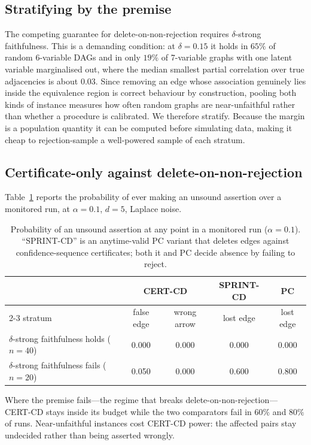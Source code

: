 \documentclass[11pt,a4paper]{article}
\theoremstyle{definition}
\theoremstyle{remark}
\begin{document}
\subsection{Stratifying by the premise}

The competing guarantee for delete-on-non-rejection requires
$\delta$-strong faithfulness. This is a demanding condition: at $\delta = 0.15$
it holds in $65\%$ of random 6-variable DAGs and in only $19\%$ of 7-variable
graphs with one latent variable marginalised out, where the median smallest
partial correlation over true adjacencies is about $0.03$. Since removing an
edge whose association genuinely lies inside the equivalence region is correct
behaviour by construction, pooling both kinds of instance measures how often
random graphs are near-unfaithful rather than whether a procedure is calibrated.
We therefore stratify. Because the margin is a population quantity it can be
computed before simulating data, making it cheap to rejection-sample a
well-powered sample of each stratum.

\subsection{Certificate-only against delete-on-non-rejection}

Table~\ref{tab:main} reports the probability of ever making an unsound assertion
over a monitored run, at $\alpha = 0.1$, $d = 5$, Laplace noise.

\begin{table}[t]
\centering
\caption{Probability of an unsound assertion at any point in a monitored run
($\alpha = 0.1$). ``SPRINT-CD'' is an anytime-valid PC variant that deletes
edges against confidence-sequence certificates; both it and PC decide absence by
failing to reject.}
\label{tab:main}
\begin{tabular}{lcccc}
\toprule
& \multicolumn{2}{c}{CERT-CD} & SPRINT-CD & PC \\
\cmidrule(lr){2-3}
stratum & false edge & wrong arrow & lost edge & lost edge \\
\midrule
$\delta$-strong faithfulness holds ($n=40$) & 0.000 & 0.000 & 0.000 & 0.000 \\
$\delta$-strong faithfulness fails ($n=20$) & 0.050 & 0.000 & 0.600 & 0.800 \\
\bottomrule
\end{tabular}
\end{table}

Where the premise fails---the regime that breaks delete-on-non-rejection---
CERT-CD stays inside its budget while the two comparators fail in $60\%$ and
$80\%$ of runs. Near-unfaithful instances cost CERT-CD power: the affected pairs
stay undecided rather than being asserted wrongly.
\end{document}
